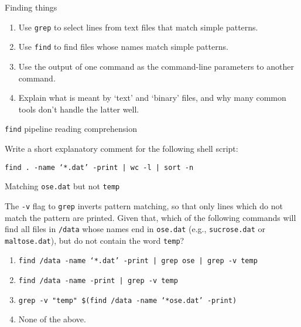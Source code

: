 \documentclass{beamer}
\begin{document}
\begin{frame}{Finding things}

\begin{enumerate}
    \item{Use \texttt{grep} to select lines from text files that match simple patterns.}
    \item{Use \texttt{find} to find files whose names match simple patterns.}
    \item{Use the output of one command as the command-line parameters to another command.}
    \item{Explain what is meant by `text' and `binary' files, and why many common tools don't handle the latter well.}
\end{enumerate}


\end{frame}


\begin{frame}{\texttt{find} pipeline reading comprehension}

Write a short explanatory comment for the following shell script:
\vspace{0.5cm}

\begin{beamerboxesrounded}[upper=uppercolgreen,lower=lowercolgreen,shadow=false]{}
\texttt{find . -name `*.dat' -print | wc -l | sort -n}
\end{beamerboxesrounded}


\end{frame}


\begin{frame}{Matching \texttt{ose.dat} but not \texttt{temp}}

The \texttt{-v} flag to \texttt{grep} inverts pattern matching, so that only lines which do not match the pattern are printed. Given that, which of the following commands will find all files in \texttt{/data} whose names end in \texttt{ose.dat} (e.g., \texttt{sucrose.dat} or \texttt{maltose.dat}), but do not contain the word \texttt{temp}?


\begin{enumerate}

\item{\texttt{find /data -name `*.dat' -print | grep ose | grep -v temp}}
\item{\texttt{find /data -name  -print | grep -v temp}}
\item{\texttt{grep -v "temp" \$(find /data -name `*ose.dat' -print)}}
\item{None of the above.}

\end{enumerate}

\end{frame}
\end{document}
